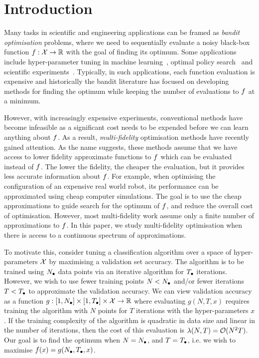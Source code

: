 
\section{Introduction}
\label{sec:intro}

Many tasks in scientific and engineering applications can be framed as \emph{bandit
optimisation} problems, where we need to sequentially evaluate a noisy
black-box function $f:\mathcal{X}\rightarrow\mathbb{R}$ with the goal of finding its optimum.
Some applications include hyper-parameter tuning in machine learning~\citep{%
snoek12practicalBO,hutter11smac}, optimal policy search~\citep{lizotte07automaticGait,
martinez07robotplanning} and scientific experiments~\citep{parkinson06wmap3,gonzalez14gene}.
Typically, in such applications, each function evaluation is expensive and historically
the bandit literature has focused on developing methods for finding the optimum
while keeping the number of evaluations to $f$ at a minimum.

However, with increasingly expensive experiments, conventional methods have become
infeasible as a significant cost needs to be expended before we can learn anything
about $f$.
As a result, \emph{multi-fidelity} optimisation methods have recently gained attention.
As the name suggests, these methods assume that we have access to lower fidelity
approximate functions to $f$ which can be evaluated instead of $f$.
The lower the fidelity, the cheaper the evaluation, but it provides less accurate
information about $f$.
For example, when optimising the configuration of an expensive real world robot,
its performance can be approximated using cheap computer simulations.
The goal is to use the cheap approximations to guide search for the optimum of $f$,
and reduce the overall cost of optimisation.
However, most multi-fidelity work assume only a finite number of approximations to
$f$.
In this paper, we study multi-fidelity optimisation when there is access to a continuous
spectrum of approximations.



To motivate this,
consider tuning a classification algorithm over a space of hyper-parameters $\mathcal{X}$
by maximising a validation set accuracy. 
The algorithm is to be trained using $N_{{\bullet}}$
data points via an iterative algorithm for $T_{{\bullet}}$ iterations.
However, we wish to use fewer training points $N<N_{{\bullet}}$ and/or fewer iterations
$T<T_{{\bullet}}$ to approximate the validation accuracy.
We can view validation accuracy as a function
$g:[1,N_{{\bullet}}]\times[1,T_{{\bullet}}]\times\mathcal{X}\rightarrow\mathbb{R}$ where evaluating $g(N,T,x)$
requires training the algorithm with $N$ points for $T$ iterations with the
hyper-parameters $x$.
If the training complexity of the algorithm is quadratic in data size and linear in the
number of iterations, then the cost of this evaluation is $\lambda(N,T) = \mathcal{O}(N^2T)$.
Our goal is to find the optimum when $N=N_{{\bullet}}$, and $T=T_{{\bullet}}$,
i.e.  we wish to maximise $f(x) = g(N_{{\bullet}},T_{{\bullet}}, x)$.

